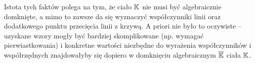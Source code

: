 Istota tych faktów polega na tym,
że ciało $\mathbb{K}$ nie musi być algebraicznie domknięte,
a mimo to zawsze da się wyznaczyć współczynniki linii
oraz dodatkowego punktu przecięcia linii z krzywą.
A priori nie było to oczywiste --
uzyskane wzory mogły być bardziej skomplikowane (np. wymagać pierwiastkowania)
i konkretne wartości niezbędne do wyrażenia współczynników i współrzędnych
znajdowałyby się dopiero w domknięciu algebraicznym $\overline{\mathbb{K}}$
ciała $\mathbb{K}$.
